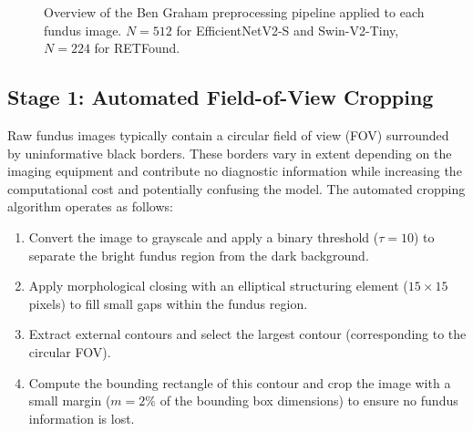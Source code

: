 \begin{figure}[htbp]
    \centering
    \caption{Overview of the Ben Graham preprocessing pipeline applied to each fundus image. $N = 512$ for EfficientNetV2-S and Swin-V2-Tiny, $N = 224$ for RETFound.}
    \label{fig:preprocessing_pipeline}
\end{figure}

\subsection{Stage 1: Automated Field-of-View Cropping}
\label{sec:fov_crop}

Raw fundus images typically contain a circular field of view (FOV) surrounded by uninformative black borders. These borders vary in extent depending on the imaging equipment and contribute no diagnostic information while increasing the computational cost and potentially confusing the model. The automated cropping algorithm operates as follows:

\begin{enumerate}
    \item Convert the image to grayscale and apply a binary threshold ($\tau = 10$) to separate the bright fundus region from the dark background.
    \item Apply morphological closing with an elliptical structuring element ($15 \times 15$ pixels) to fill small gaps within the fundus region.
    \item Extract external contours and select the largest contour (corresponding to the circular FOV).
    \item Compute the bounding rectangle of this contour and crop the image with a small margin ($m = 2\%$ of the bounding box dimensions) to ensure no fundus information is lost.
\end{enumerate}

